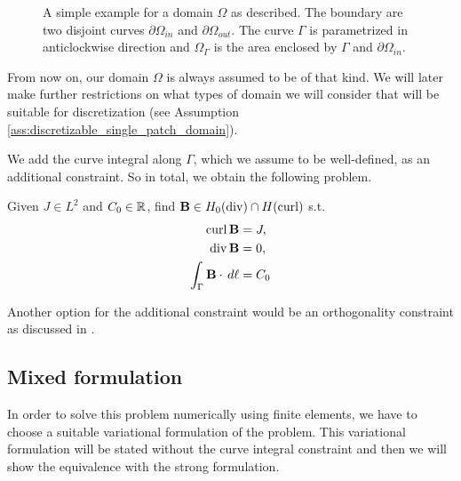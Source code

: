 \documentclass[../master_thesis.tex]{subfiles}
\begin{document}
\begin{figure}
    \centering
\caption{A simple example for a domain $\Omega$ as described. The boundary are two 
disjoint curves $\partial \Omega_{in}$ and $\partial \Omega_{out}$. The curve 
$\Gamma$ is parametrized in anticlockwise direction and $\Omega_\Gamma$ is the 
area enclosed by $\Gamma$ and $\partial \Omega_{in}$.} \label{fig:annulus_domain}
\end{figure}

From now on, our domain $\Omega$ is always assumed to be of that kind. We will 
later make further restrictions on what types of domain we will consider that 
will be suitable for discretization (see Assumption\,\ref{ass:discretizable_single_patch_domain}).


We add the curve integral along $\Gamma$, which we 
assume to be well-defined, as an additional constraint.
So in total, we obtain the following problem.
\begin{problem}\label{prob:2d_magnetostatic_problem}
    Given $J \in L^2$ and $C_0 \in \mathbb{R}$, find $\mathbf{B} \in H_0(\operatorname{div}) \cap H(\operatorname{curl})$ s.t.
    \begin{align*}
        \operatorname{curl} \mathbf{B} &= J, 
        \\ \operatorname{div} \mathbf{B} &= 0,
        \\ \int_\Gamma \mathbf{B} \cdot \, d\ell &= C_0
    \end{align*}
\end{problem}

Another option for the additional constraint would be an orthogonality constraint as discussed 
in \cite[Sec.\,3.5]{multipatch_paper}.

\subsection{Mixed formulation}
In order to solve this problem numerically using finite elements, we have to 
choose a suitable variational formulation of the problem. This variational formulation 
will be stated without the curve integral constraint and then we will show 
the equivalence with the strong formulation.
\end{document}
